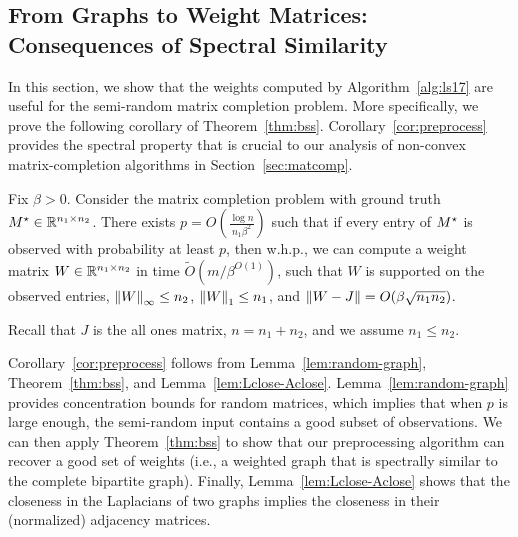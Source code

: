 
\subsection{From Graphs to Weight Matrices: Consequences of Spectral Similarity}
\label{sec:lap-to-adj}
In this section, %
we show that the weights computed by Algorithm~\ref{alg:ls17} are useful for the semi-random matrix completion problem.
More specifically, we prove the following corollary of Theorem~\ref{thm:bss}.
Corollary~\ref{cor:preprocess} provides the spectral property that is crucial to our analysis of non-convex matrix-completion algorithms in Section~\ref{sec:matcomp}. %

\begin{corollary}
\label{cor:preprocess}
Fix $\beta > 0$.
Consider the matrix completion problem with ground truth $M^\star \in \mathbb{R}^{n_1 \times n_2}$.
There exists $p = O\left(\frac{\log n}{n_1 \beta^2}\right)$ such that if every entry of $M^\star$ is observed with probability at least $p$,
then w.h.p., we can compute a weight matrix $W \in \mathbb{R}^{n_1 \times n_2}$ in time $\tilde O(m / \beta^{O(1)})$, such that $W$ is supported on the observed entries, ${\lVert W{\rVert}}_\infty \le n_2$, ${\lVert W{\rVert}}_1 \le n_1$, and $\lVert W-J{\rVert} = O(\beta \sqrt{n_1 n_2})$.
\end{corollary}
Recall that $J$ is the all ones matrix, $n = n_1 + n_2$, and we assume $n_1 \le n_2$.

Corollary~\ref{cor:preprocess} follows from Lemma~\ref{lem:random-graph}, Theorem~\ref{thm:bss}, and Lemma~\ref{lem:Lclose-Aclose}.
Lemma~\ref{lem:random-graph} provides concentration bounds for random matrices, which implies that when $p$ is large enough, the semi-random input contains a good subset of observations.
We can then apply Theorem~\ref{thm:bss} to show that our preprocessing algorithm can recover a good set of weights (i.e., a weighted graph that is spectrally similar to the complete bipartite graph).
Finally, Lemma~\ref{lem:Lclose-Aclose} shows that the closeness in the Laplacians of two graphs implies the closeness in their (normalized) adjacency matrices. %

